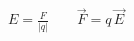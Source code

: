 \documentclass[preview,border=1pt,12pt]{standalone}
\begin{document}
$\displaystyle E = \frac{F}{\lvert q \rvert} \qquad \vec{F} = q\,\vec{E}$
\end{document}
